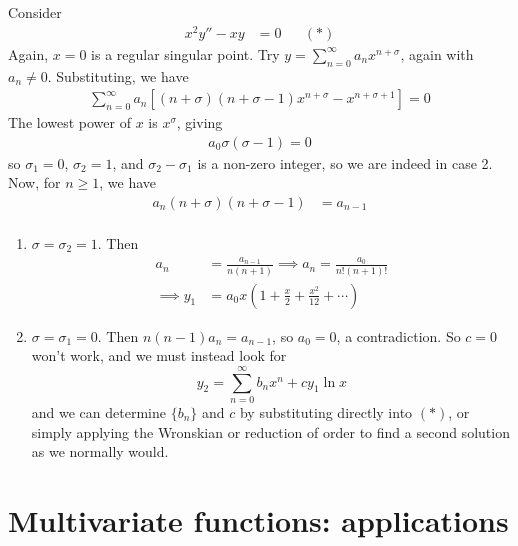 \documentclass{../../template/note}
\begin{document}
    \begin{example}[Case 2]
        Consider
        \begin{align*}
            x^2y'' - xy &= 0 && (*)
        \end{align*}
        Again, \(x=0\) is a regular singular point. Try \(y = \sum_{n=0}^\infty a_n x^{n+\sigma}\), again with \(a_n \neq 0\). Substituting, we have
        \begin{align*}
            \sum_{n=0}^\infty a_n\left[(n+\sigma)(n+\sigma-1)x^{n+\sigma}-x^{n+\sigma+1}\right] = 0
        \end{align*}
        The lowest power of \(x\) is \(x^\sigma\), giving
        \begin{align*}
            a_0\sigma(\sigma-1)=0
        \end{align*}
        so \(\sigma_1 = 0\), \(\sigma_2 = 1\), and \(\sigma_2-\sigma_1\) is a non-zero integer, so we are indeed in case 2. Now, for \(n \geq 1\), we have
        \begin{align*}
            a_n(n+\sigma)(n+\sigma-1)&=a_{n-1} \\
        \end{align*}
        \begin{enumerate}[label=\protect\circled{\arabic*}]
            \item \(\sigma=\sigma_2=1\). Then
            \begin{align*}
                a_n &= \frac{a_{n-1}}{n(n+1)} \implies a_n = \frac{a_0}{n!(n+1)!} \\
                \implies y_1 &= a_0x\left(1+\frac x 2 + \frac{x^2}{12} + \cdots\right)
            \end{align*}
            \item \(\sigma=\sigma_1=0\). Then \(n(n-1)a_n = a_{n-1}\), so \(a_0 = 0\), a contradiction. So \(c=0\) won't work, and we must instead look for
            \[
                y_2 = \sum_{n=0}^\infty b_nx^n + cy_1 \ln x
            \]
            and we can determine \(\{b_n\}\) and \(c\) by substituting directly into \((*)\), or simply applying the Wronskian or reduction of order to find a second solution as we normally would.
        \end{enumerate}
    \end{example}


    \section{Multivariate functions: applications}
\end{document}
